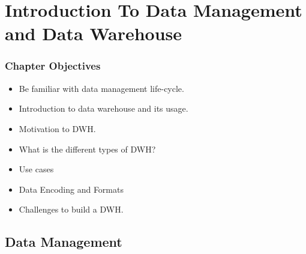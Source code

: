 \section{Introduction To Data Management and Data Warehouse}


\begin{frame}
\frametitle{Chapter Objectives}

\begin{itemize}
	\item<1-> Be familiar with data management life-cycle. \pause
	\item<2-> Introduction to data warehouse and its usage. \pause	
	\item<3-> Motivation to DWH.\pause
	\item<4-> What is the different types of DWH?\pause
	\item<5-> Use cases\pause
	\item<6-> Data Encoding and Formats\pause	
	\item<6-> Challenges to build a DWH.\pause
\end{itemize}

\end{frame}


\subsection{Data Management}

